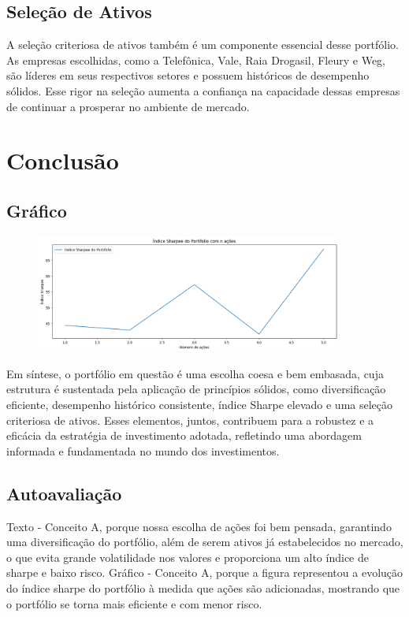 \documentclass{article}
\begin{document}
    \subsection*{Seleção de Ativos}

    A seleção criteriosa de ativos também é um componente essencial desse portfólio. As empresas escolhidas, como a Telefônica, 
    Vale, Raia Drogasil, Fleury e Weg, são líderes em seus respectivos setores e possuem históricos de desempenho sólidos. Esse 
    rigor na seleção aumenta a confiança na capacidade dessas empresas de continuar a prosperar no ambiente de mercado.

    \section*{Conclusão}

    \subsection{Gráfico}
    \begin{figure}[h]
        \centering
        \includegraphics[width=0.9\textwidth]{shapee.png}
    \end{figure}

    Em síntese, o portfólio em questão é uma escolha coesa e bem embasada, cuja estrutura é sustentada pela aplicação de 
    princípios sólidos, como diversificação eficiente, desempenho histórico consistente, índice Sharpe elevado e uma seleção 
    criteriosa de ativos. Esses elementos, juntos, contribuem para a robustez e a eficácia da estratégia de investimento adotada, 
    refletindo uma abordagem informada e fundamentada no mundo dos investimentos.

    \subsection{Autoavaliação}

    Texto - Conceito A, porque nossa escolha de ações foi bem pensada, garantindo uma diversificação 
    do portfólio, além de serem ativos já estabelecidos no mercado, o que evita grande volatilidade nos 
    valores e proporciona um alto índice de sharpe e baixo risco.
    Gráfico - Conceito A, porque a figura representou a evolução do índice sharpe do portfólio à medida
    que ações são adicionadas, mostrando que o portfólio se torna mais eficiente e com menor risco.
\end{document}
